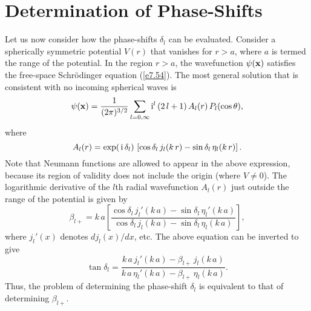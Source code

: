 \section{Determination of Phase-Shifts}
Let us now consider how the phase-shifts $\delta_l$ can be
 evaluated. Consider a spherically symmetric potential $V(r)$ that 
vanishes for $r>a$, where $a$ is termed the range of the potential.
In the region $r>a$, the wavefunction $\psi({\bf x})$ 
satisfies the free-space Schr\"{o}dinger equation (\ref{e7.54}). The
most general solution that is consistent with no incoming spherical waves is
\begin{equation}
\psi({\bf x}) = \frac{1}{(2\pi)^{3/2}} \sum_{l=0,\infty}
{\rm i}^l\, (2\,l+1) \, A_l(r)\, P_l(\cos\theta),
\end{equation}
where
\begin{equation}\label{e7.80}
A_l(r) = \exp(\,{\rm i} \,\delta_l)\,
\left[ \cos\delta_l \,j_l(k\,r) -\sin\delta_l\, \eta_l(k\,r)\right].
\end{equation}
Note that  Neumann functions are allowed to appear in the above
expression, because its region of validity does not include the origin
(where $V\neq 0$). The logarithmic derivative of the $l$th 
radial wavefunction
$A_l(r)$ just outside the range of the potential is given by
\begin{equation}
\beta_{l+} = k\,a \left[\frac{ \cos\delta_l\,j_l'(k\,a) -
\sin\delta_l\, \eta_l'(k\,a)}{\cos\delta_l \,
j_l(k\,a) - \sin\delta_l\,\eta_l(k\,a)}\right],
\end{equation}
where $j_l'(x)$ denotes $dj_l(x)/dx$, {\rm etc}. The above equation
can be inverted to give
\begin{equation}\label{e7.82}
\tan \delta_l = \frac{ k\,a\,j_l'(k\,a) - \beta_{l+}\, j_l(k\,a)}
{k\,a\,\eta_l'(k\,a) - \beta_{l+}\, \eta_l(k\,a)}.
\end{equation}
Thus, the problem of determining the phase-shift $\delta_l$ is equivalent
to that of determining $\beta_{l+}$. 

